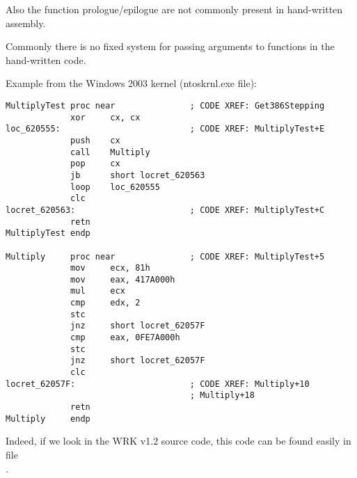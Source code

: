 \par

Also the function prologue/epilogue are not commonly present in hand-written assembly.
\par

Commonly there is no fixed system for passing arguments to functions in the hand-written code.

\par
Example from the Windows 2003 kernel 
(ntoskrnl.exe file):

\begin{lstlisting}
MultiplyTest proc near               ; CODE XREF: Get386Stepping
             xor     cx, cx
loc_620555:                          ; CODE XREF: MultiplyTest+E
             push    cx
             call    Multiply
             pop     cx
             jb      short locret_620563
             loop    loc_620555
             clc
locret_620563:                       ; CODE XREF: MultiplyTest+C
             retn
MultiplyTest endp

Multiply     proc near               ; CODE XREF: MultiplyTest+5
             mov     ecx, 81h
             mov     eax, 417A000h
             mul     ecx
             cmp     edx, 2
             stc
             jnz     short locret_62057F
             cmp     eax, 0FE7A000h
             stc
             jnz     short locret_62057F
             clc
locret_62057F:                       ; CODE XREF: Multiply+10
                                     ; Multiply+18
             retn
Multiply     endp
\end{lstlisting}

Indeed, if we look in the 
\ac{WRK} v1.2 source code, this code
can be found easily in file \\
.
